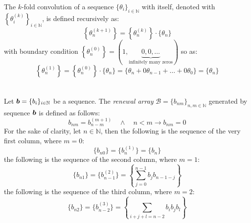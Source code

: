 The $k$-fold convolution of a sequence $\lbrace
\theta_{i}\rbrace_{i\in\mathbb{N}}$ 
with itself, denoted with  $\left\lbrace
\theta_{i}^{(k)}\right\rbrace_{i\in\mathbb{N}}$, is defined recursively as:
\begin{displaymath}
    \left\lbrace\theta_{n}^{(k+1)}\right\rbrace= \left\lbrace\theta_{n}^{(k)}\right\rbrace\cdot
        \lbrace\theta_{n}\rbrace
\end{displaymath}
with boundary condition $\left\lbrace\theta_{n}^{(0)}\right\rbrace=(1,\underbrace{0,0,\ldots}_{\text{infinitely many zeros}})$ so as:
\begin{displaymath}
    \left\lbrace\theta_{n}^{(1)}\right\rbrace= \left\lbrace\theta_{n}^{(0)}\right\rbrace\cdot
        \lbrace\theta_{n}\rbrace=
        \lbrace\theta_{n}+0\theta_{n-1}+\ldots+0\theta_{0}\rbrace=
        \lbrace\theta_{n}\rbrace
\end{displaymath}
\\\\
Let $\boldsymbol{b}=\lbrace b_{i}\rbrace_{i\in\mathbb{N}}$ be a sequence. 
The \emph{renewal array} 
$\mathcal{B}=\lbrace b_{nm}\rbrace_{n,m\in\mathbb{N}}$
generated by sequence $\boldsymbol{b}$ is defined as follows:
\begin{displaymath}
    b_{nm}=b_{n-m}^{(m+1)} \quad\wedge\quad n < m\rightarrow b_{nm}=0
\end{displaymath}
For the sake of clarity, let $n\in\mathbb{N}$, then
the following is the sequence of the very first column, where $m=0$:
\begin{displaymath}
    \lbrace b_{n0}\rbrace
        =\lbrace b_{n}^{(1)}\rbrace
        =\lbrace b_{n}\rbrace
\end{displaymath}
the following is the sequence of the second column, where $m=1$:
\begin{displaymath}
    \lbrace b_{n1}\rbrace
        =\lbrace b_{n-1}^{(2)}\rbrace
        =\left\lbrace \sum_{j=0}^{n-1}{b_{j}b_{n-1-j}}\right\rbrace
\end{displaymath}
the following is the sequence of the third column, where $m=2$:
\begin{displaymath}
    \lbrace b_{n2}\rbrace
        =\lbrace b_{n-2}^{(3)}\rbrace
        =\left\lbrace \sum_{i+j+l=n-2}{b_{i}b_{j}b_{l}}\right\rbrace
\end{displaymath}
